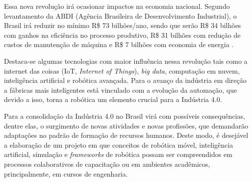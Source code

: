 Essa nova revolução irá ocasionar impactos na economia nacional. Segundo levantamento da ABDI (Agência Brasileira de Desenvolvimento Industrial), o Brasil irá reduzir no mínimo R\$ 73 bilhões/ano, sendo que serão R\$ 34 bilhões com ganhos na eficiência no processo produtivo, R\$ 31 bilhões com redução de custos de manutenção de máquina e  R\$ 7 bilhões com economia de energia \cite{abdi}.

Destaca-se algumas tecnologias com maior influência nessa revolução tais como a internet das coisas (IoT, \textit{Internet of Things}), \textit{big data}, computação em nuvem, inteligência artificial e robótica avançada. Para  o avanço da indústria em direção a fábricas mais inteligentes está vinculado com a evolução da automação, que devido a isso, torna a robótica um elemento crucial para a Indústria 4.0.

Para  a consolidação da Indústria 4.0 no Brasil virá com possíveis consequências, dentre elas, o surgimento de novas atividades e novas profissões, que demandarão adaptações no padrão de formação de recursos humanos. Deste modo, é desejável a elaboração de um projeto em que conceitos de robótica móvel, inteligência artificial, simulação e \textit{frameworks} de robótica possam ser compreendidos em processos colaborativos de capacitação ou em ambientes acadêmicos, principalmente, em cursos de engenharia.       

\begin{comment}
\section{Organização do trabalho}
\label{section:organizacao}

Este documento apresenta $5$ capítulos e está estruturado da seguinte forma:

\begin{itemize}

  \item \textbf{Capítulo \ref{chap:intro} - Introdução}: Contextualiza o âmbito, no qual a pesquisa proposta está inserida. Apresenta, portanto, a definição do problema, objetivos e justificativas da pesquisa e como este \thetypeworkthree está estruturado;
  \item \textbf{Capítulo \ref{chap:fundteor} - Fundamentação Teórica}: XXX;
  \item \textbf{Capítulo \ref{chap:mat} - Materiais e Métodos}: XXX;
  \item \textbf{Capítulo \ref{chap:result} - Resultados}: XXX;
  \item \textbf{Capítulo \ref{chap:conc} - Conclusão}: Apresenta as conclusóes, contribuições e algumas sugestões de atividades de pesquisa a serem desenvolvidas no futuro.

\end{itemize}
\end{comment}